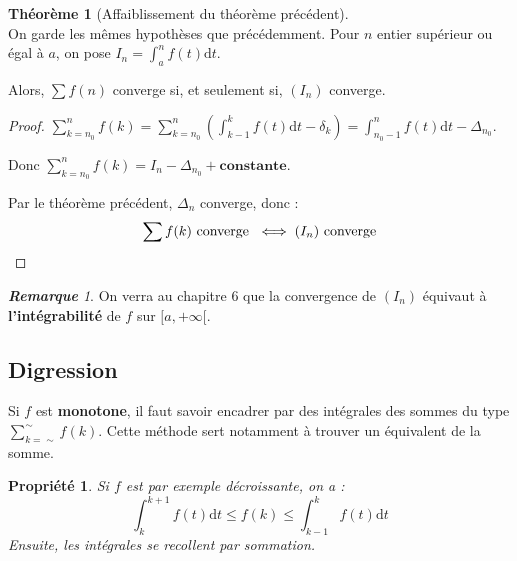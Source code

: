 \documentclass[12pt]{book}
\newcommand{\cste}{\ensuremath{\textbf{constante}}}
\newtheorem*{prop}{Propriété}
\theoremstyle{definition}
\newtheorem{thme}{Théorème}[chapter]
\theoremstyle{remark}
\newtheorem*{rem}{\textbf{Remarque}}
\newenvironment{fthme}
  {\begin{mdframed}[roundcorner=10pt, linewidth=2pt]\begin{thme}}
  {\end{thme}\end{mdframed}}
\begin{document}
	\begin{fthme}[Affaiblissement du théorème précédent]\mbox{~}\\
	On garde les mêmes hypothèses que précédemment. Pour $n$ entier supérieur ou égal à $a$, on pose $I_n = \int_a^n f(t)\mathrm{d}t$. 
	
	Alors, $\sum f(n)$ converge si, et seulement si, $(I_n)$ converge.
	\end{fthme}
	\begin{proof}
	$\sum_{k=n_0}^n f(k) = \sum_{k=n_0}^n \left( \int_{k-1}^k f(t)\mathrm{d}t - \delta_k \right) = \int_{n_0-1}^n f(t)\mathrm{d}t - \Delta_{n_0}$.
	
	Donc $\sum_{k=n_0}^n f(k) = I_n - \Delta_{n_0} + \cste$.
	
	Par le théorème précédent, $\Delta_n$ converge, donc :
	\[ \sum f(k) \text{ converge } \;\Longleftrightarrow\; (I_n) \text{ converge} \qedhere\] 
	\end{proof}
	
	\begin{rem}
	On verra au chapitre 6 que la convergence de $(I_n)$ équivaut à \textbf{l'intégrabilité} de $f$ sur $[a, +\infty[$.
	\end{rem}
	
	\subsection{Digression}
	Si $f$ est \textbf{monotone}, il faut savoir encadrer par des intégrales des sommes du type $\sum_{k=\sim}^\sim f(k)$. Cette méthode sert notamment à trouver un équivalent de la somme. 
	\begin{prop}
	Si $f$ est par exemple décroissante, on a : 
	\[ \int_k^{k+1} f(t) \mathrm{d}t \leq f(k) \leq \int_{k-1}^k f(t) \mathrm dt \]
	Ensuite, les intégrales se recollent par sommation.
	\end{prop}
	
\end{document}

